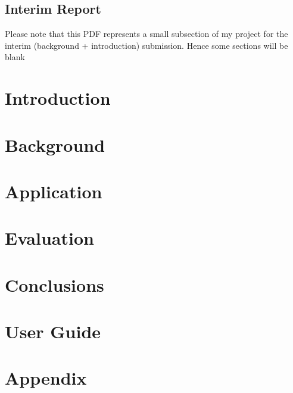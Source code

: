 




\section*{Interim Report}

Please note that this PDF represents a small subsection of my project for the interim (background + introduction) submission. Hence some sections will be blank



\pagebreak

\chapter{Introduction}


\chapter{Background}


\chapter{Application}

\label{chapter:application}

\chapter{Evaluation}


\chapter{Conclusions}


\chapter{User Guide}


\printbibliography

\appendix
\chapter{Appendix}





